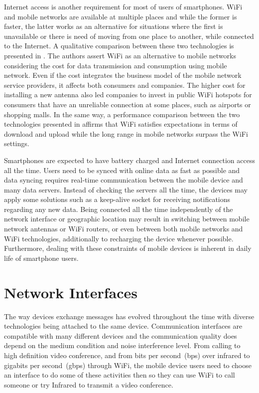 Internet access is another requirement for most of users of smartphones.
WiFi and mobile networks are available at multiple places and while the former is faster, the latter works as an alternative for situations where the first is unavailable or there is need of moving from one place to another, while connected to the Internet.
A qualitative comparison between these two technologies is presented in \cite{Lehr2003wireless}.
The authors assert WiFi as an alternative to mobile networks considering the cost for data transmission and consumption using mobile network.
Even if the cost integrates the business model of the mobile network service providers, it affects both consumers and companies.
The higher cost for installing a new antenna also led companies to invest in public WiFi hotspots for consumers that have an unreliable connection at some places, such as airports or shopping malls.
In the same way, a performance comparison between the two technologies presented in \cite{Gass20103gwificomparison} affirms that WiFi satisfies expectations in terms of download and upload while the long range in mobile networks surpass the WiFi settings.

Smartphones are expected to have battery charged and Internet connection access all the time.
Users need to be synced with online data as fast as possible and data syncing requires real-time communication between the mobile device and many data servers.
Instead of checking the servers all the time, the devices may apply some solutions such as a keep-alive socket for receiving notifications regarding any new data.
Being connected all the time independently of the network interface or geographic location may result in switching between mobile network antennas or WiFi routers, or even between both mobile networks and WiFi technologies, additionally to recharging the device whenever possible.
Furthermore, dealing with these constraints of mobile devices is inherent in daily life of smartphone users.

\section{Network Interfaces}
\label{sec:networkinterfaces}

The way devices exchange messages has evolved throughout the time with diverse technologies being attached to the same device.
Communication interfaces are compatible with many different devices and the communication quality does depend on the medium condition and noise interference level.
From calling to high definition video conference, and from bits per second~(bps) over infrared to gigabits per second~(gbps) through WiFi, the mobile device users need to choose an interface to do some of these activities then so they can use WiFi to call someone or try Infrared to transmit a video conference.

